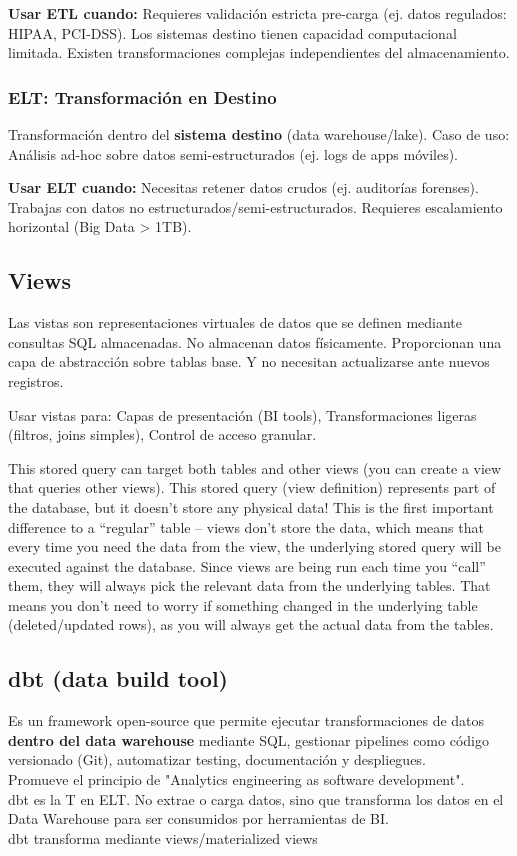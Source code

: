 \documentclass[12pt]{book}
\begin{document}
\textbf{Usar ETL cuando:} Requieres validación estricta pre-carga (ej. datos regulados: HIPAA, PCI-DSS). 
Los sistemas destino tienen capacidad computacional limitada. Existen transformaciones complejas independientes 
del almacenamiento.

\subsubsection{ELT: Transformación en Destino}
Transformación dentro del \textbf{sistema destino} (data warehouse/lake). Caso de uso: Análisis 
ad-hoc sobre datos semi-estructurados (ej. logs de apps móviles).

\textbf{Usar ELT cuando:} 
Necesitas retener datos crudos (ej. auditorías forenses). Trabajas con datos no 
estructurados/semi-estructurados. Requieres escalamiento horizontal (Big Data > 1TB).

\subsection{Views}
Las vistas son representaciones virtuales de datos que se  definen mediante consultas 
SQL almacenadas. No almacenan datos físicamente. Proporcionan una capa de abstracción 
sobre tablas base. Y no necesitan actualizarse ante nuevos registros.

Usar vistas para: Capas de presentación (BI tools), Transformaciones ligeras (filtros, 
joins simples), Control de acceso granular. 

This stored query can target both tables and other views (you can create a view that queries other views). This stored query (view definition) represents part of the database, but it doesn’t store any physical data! This is the first important difference to a “regular” table – views don’t store the data, which means that every time you need the data from the view, the underlying stored query will be executed against the database. Since views are being run each time you “call” them, they will always pick the relevant data from the underlying tables. That means you don’t need to worry if something changed in the underlying table (deleted/updated rows), as you will always get the actual data from the tables.

\subsection{dbt (data build tool)}
Es un framework open-source que permite ejecutar transformaciones de datos \textbf{dentro 
del data warehouse} mediante SQL, gestionar pipelines como código versionado (Git), automatizar 
testing, documentación y despliegues.\\
Promueve el principio de "Analytics engineering as software development".\\
dbt es la T en ELT. No extrae o carga datos, sino que transforma los datos en el Data Warehouse 
para ser consumidos por herramientas de BI.\\
dbt transforma mediante views/materialized views\\
\end{document}
